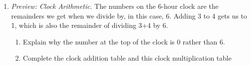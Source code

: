 \documentclass[11pt]{article}
\begin{document}
\begin{enumerate}
\item \emph{Preview: Clock Arithmetic.}
The numbers on the 6-hour clock are the
remainders we get when we divide by, in this case, 6.   Adding 3 to 4
gets us to 1, which is also the remainder of dividing 3+4 by 6.

\begin{enumerate}


\item Explain why the number at the top of the clock is 0 rather
than 6.

\item Complete the clock addition table and this clock multiplication table


\end{enumerate}
\end{enumerate}
\end{document}
